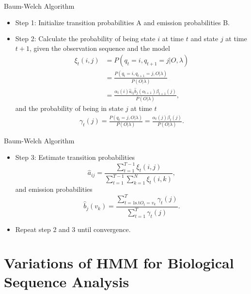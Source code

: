 \documentclass{beamer}
\begin{document}
\begin{frame}{Baum-Welch Algorithm}
	\begin{itemize}
	\item Step 1: Initialize transition probabilities A and emission probabilities B.
	\item Step 2: Calculate the probability of being state $i$ at time $t$ and state $j$ at time $t+1$, given the observation sequence and the model
	\begin{equation}
		\begin{split}
			\xi_t(i,j) & = P(q_t = i, q_{t+1} =j \vert O, \lambda) \\ 
			& =\frac{ P(q_t = i, q_{t+1} =j , O \vert \lambda)}{P(O\vert \lambda)} \\
			& = \frac{\alpha_t(i) \hat{a}_{ij}\hat{b}_j(o_{t+1}) \beta_{t+1}(j)}{P(O\vert \lambda)},
		\end{split}
	\end{equation}
	and the probability of being in state $j$ at time $t$
	\begin{equation}
		\begin{split}
			\gamma_t(j) = \frac{ P(q_t = j, O \vert \lambda)}{P(O\vert \lambda)} = \frac{\alpha_t(j)\beta_t(j)}{P(O\vert \lambda)}.
		\end{split}
	\end{equation}
	\end{itemize}
\end{frame}

\begin{frame}{Baum-Welch Algorithm}
	\begin{itemize}
		\item Step 3: Estimate transition probabilities
		\begin{equation}
			\hat{a}_{ij} = \frac{\sum_{t=1}^{T-1}\xi_t(i,j)}{\sum_{t=1}^{T-1}\sum_{k=1}^{N}\xi_t(i,k)},
		\end{equation}
		and emission probabilities
		\begin{equation}
			\hat{b}_j(v_k) = \frac{\sum_{t=1 \text{s.t} O_t = v_k}^T \gamma_t(j)}{\sum_{t=1}^{T}\gamma_t(j)}.
		\end{equation}
		\item Repeat step 2 and 3 until convergence.
	\end{itemize}
\end{frame}

\section{Variations of HMM for Biological Sequence Analysis}
\end{document}
